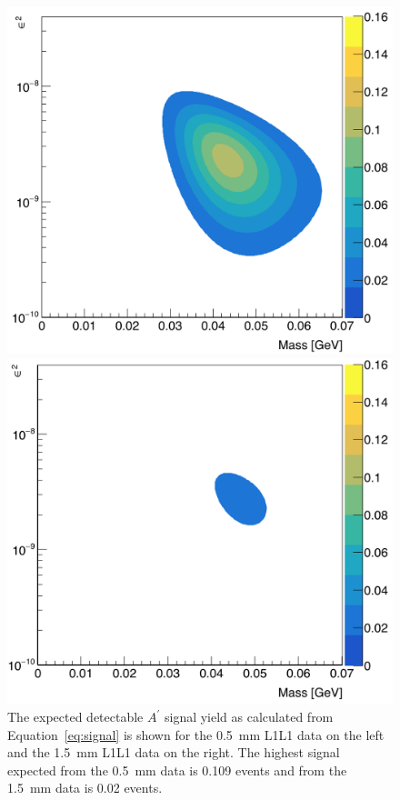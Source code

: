 \begin{figure}[hbt]
\begin{minipage}{0.5\textwidth}
 \includegraphics[width=\textwidth]{pics/appendix/reachL1L1_0p5.png}
\end{minipage}\hfill\begin{minipage}{0.5\textwidth}
 \includegraphics[width=\textwidth]{pics/appendix/reachL1L1_1p5.png}
 \end{minipage}
  \caption[Expected detectable $A^{\prime}$ signal yield for the individual L1L1 data sets]{The expected detectable $A^{\prime}$ signal yield as calculated from Equation~\eqref{eq:signal} is shown for the 0.5~mm L1L1 data on the left and the 1.5~mm L1L1 data on the right. The highest signal expected from the 0.5~mm data is 0.109 events and from the 1.5~mm data is 0.02 events.}
  \label{fig:L1L1_reach}
\end{figure}
